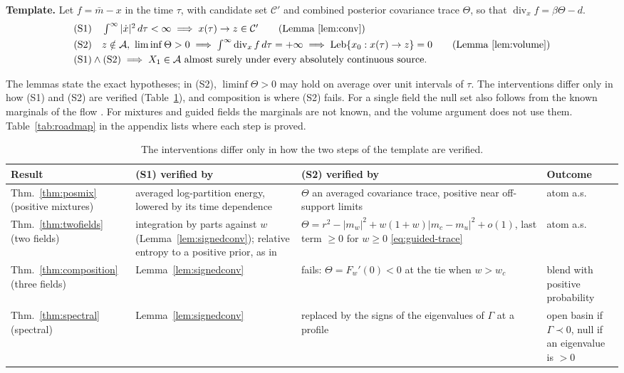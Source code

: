 \documentclass{article} %
\theoremstyle{plain}
\theoremstyle{definition}
\theoremstyle{remark}
\begin{document}
\begin{framed}
\noindent\textbf{Template.} Let $f=\bar m-x$ in the time $\tau$, with candidate set $\mathcal C'$
and combined posterior covariance trace $\Theta$, so that $\operatorname{div}_xf=\beta\Theta-d$.
\begin{align*}
&\text{(S1)}\quad \textstyle\int^\infty|\dot x|^2\,d\tau<\infty
  \;\Longrightarrow\; x(\tau)\to z\in\mathcal C'
  \tag*{(Lemma~\ref{lem:conv})}\\
&\text{(S2)}\quad z\notin\mathcal A,\ \liminf\Theta>0
  \;\Longrightarrow\; \textstyle\int^\infty\operatorname{div}_xf\,d\tau=+\infty
  \;\Longrightarrow\; \operatorname{Leb}\{x_0:x(\tau)\to z\}=0
  \tag*{(Lemma~\ref{lem:volume})}\\
&\text{(S1)}\wedge\text{(S2)}\;\Longrightarrow\;X_1\in\mathcal A\ \text{almost surely under every
  absolutely continuous source.}
\end{align*}
\end{framed}
\noindent The lemmas state the exact hypotheses; in (S2), $\liminf\Theta>0$ may hold on average
over unit intervals of $\tau$. The interventions differ only in how (S1) and (S2) are verified
(Table~\ref{tab:template}), and composition is where (S2) fails. For a single field the null set
also follows from the known marginals of the flow \citep[cf.][Theorem~5.3]{wan2025elucidating}.
For mixtures and guided fields the marginals are not known, and the volume argument does not use
them. Table~\ref{tab:roadmap} in the appendix lists where each step is proved.

\begin{table}[t]
\centering\small
\begin{tabular}{@{}>{\raggedright\arraybackslash}p{}>{\raggedright\arraybackslash}p{}>{\raggedright\arraybackslash}p{}>{\raggedright\arraybackslash}p{}@{}}
\toprule
Result & (S1) verified by & (S2) verified by & Outcome\\
\midrule
Thm.~\ref{thm:posmix} (positive mixtures) & averaged log-partition energy, lowered by its time dependence & $\Theta$ an averaged covariance trace, positive near off-support limits & atom a.s.\\
Thm.~\ref{thm:twofields} (two fields) & integration by parts against $w$ (Lemma~\ref{lem:signedconv}); relative entropy to a positive prior, as in \citet[Lemma~5.5]{liu2026geometric} & $\Theta=r^2-|m_w|^2+w(1+w)|m_c-m_u|^2+o(1)$, last term $\ge0$ for $w\ge0$ \eqref{eq:guided-trace} & atom a.s.\\
Thm.~\ref{thm:composition} (three fields) & Lemma~\ref{lem:signedconv} & fails: $\Theta=F_w'(0)<0$ at the tie when $w>w_c$ & blend with positive probability\\
Thm.~\ref{thm:spectral} (spectral) & Lemma~\ref{lem:signedconv} & replaced by the signs of the eigenvalues of $\Gamma$ at a profile & open basin if $\Gamma\prec0$, null if an eigenvalue is $>0$\\
\bottomrule
\end{tabular}
\caption{The interventions differ only in how the two steps of the template are verified.}
\label{tab:template}
\end{table}
\end{document}
